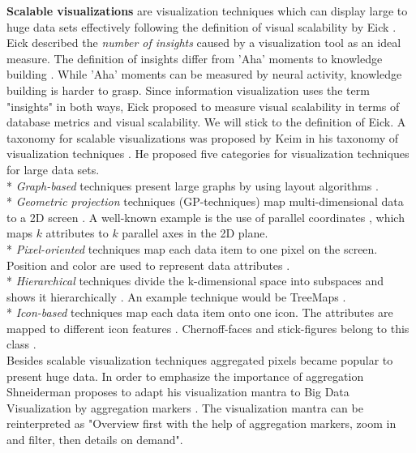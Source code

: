 \par
\textbf{Scalable visualizations} are visualization techniques which can display large to huge data sets effectively following the definition of visual scalability by Eick \cite{Eick2002}. Eick described the \textit{number of insights} caused by a visualization tool\cite{Eick2002} as an ideal measure. The definition of insights differ from 'Aha' moments to knowledge building \cite{Batyrshin2007}. While 'Aha' moments can be measured by neural activity, knowledge building is harder to grasp. Since information visualization uses the term "insights" in both ways, Eick proposed to measure visual scalability in terms of database metrics and visual scalability.  We will stick to the definition of Eick.  
\label{related:class}
A taxonomy for scalable visualizations was proposed by Keim  in his taxonomy of visualization techniques \cite{Keim1996}. 
He  proposed five categories for visualization techniques for large data sets\cite{Keim1996}. \\*
\textit{Graph-based} techniques present large graphs by using layout algorithms  \cite{Keim1996, Noirhomme-Fraiture2002}.\\*
\textit{Geometric projection} techniques (GP-techniques) map multi-dimensional data to a 2D screen  \cite{FerreiradeOliveira2003}. A well-known example is the use of parallel coordinates \cite{Inselberg1990}, which maps $k$ attributes to $k$ parallel axes in the 2D plane. \\*
\textit{Pixel-oriented} techniques map each data item to one pixel on the screen. Position and color are used to represent data attributes  \cite{Keim1996, Keim1995,  Stein2013,  Keim2000,  Keim1996pixel,  Keim2001,  Keim2005,  Keim2008}.\\*
\textit{Hierarchical} techniques divide the k-dimensional space into subspaces and shows it hierarchically \cite{Yang2003, Shneiderman1992, LeBlanc1990}. An example technique would be TreeMaps \cite{shneiderman2001ordered}.\\*
\textit{Icon-based} techniques map each data item onto one icon. The attributes are mapped to different icon features  \cite{Keim2001, Chung2014,  Borgo2013,  Fanea2005}. Chernoff-faces and stick-figures belong to this class \cite{Keim2002}. \\
Besides scalable visualization techniques aggregated pixels became popular to present huge data. In order to emphasize the importance of aggregation Shneiderman proposes to adapt his visualization mantra to Big Data Visualization by aggregation markers \cite{Shneiderman2008}. The visualization mantra can be reinterpreted as "Overview first with the help of aggregation markers, zoom in and filter, then details on demand".
